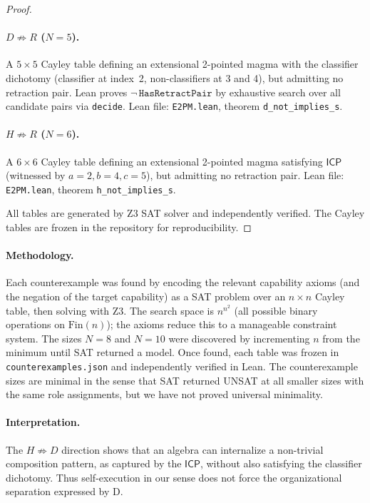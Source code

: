 \documentclass[a4paper,UKenglish,cleveref,autoref,thm-restate]{lipics-v2021}
\newcommand{\ICP}{\textsf{ICP}}
\newcommand{\Fin}{\mathrm{Fin}}
\begin{document}
\begin{proof}
\paragraph{$D \not\Rightarrow R$ ($N\!=\!5$).}
A $5 \times 5$ Cayley table defining an extensional 2-pointed magma with the classifier dichotomy (classifier at index~2, non-classifiers at 3 and 4), but admitting no retraction pair. Lean proves $\neg\,\texttt{HasRetractPair}$ by exhaustive search over all candidate pairs via \texttt{decide}. Lean file: \texttt{E2PM.lean}, theorem \texttt{d\_not\_implies\_s}.

\paragraph{$H \not\Rightarrow R$ ($N\!=\!6$).}
A $6 \times 6$ Cayley table defining an extensional 2-pointed magma satisfying $\ICP$ (witnessed by $a\!=\!2, b\!=\!4, c\!=\!5$), but admitting no retraction pair. Lean file: \texttt{E2PM.lean}, theorem \texttt{h\_not\_implies\_s}.

All tables are generated by Z3 SAT solver and independently verified. The Cayley tables are frozen in the repository for reproducibility.
\end{proof}

\paragraph{Methodology.}
Each counterexample was found by encoding the relevant capability axioms (and the negation of the target capability) as a SAT problem over an $n \times n$ Cayley table, then solving with Z3. The search space is $n^{n^2}$ (all possible binary operations on $\Fin(n)$); the axioms reduce this to a manageable constraint system. The sizes $N\!=\!8$ and $N\!=\!10$ were discovered by incrementing $n$ from the minimum until SAT returned a model. Once found, each table was frozen in \texttt{counterexamples.json} and independently verified in Lean. The counterexample sizes are minimal in the sense that SAT returned UNSAT at all smaller sizes with the same role assignments, but we have not proved universal minimality.

\paragraph{Interpretation.}
The $H \not\Rightarrow D$ direction shows that an algebra can internalize a non-trivial composition pattern, as captured by the $\ICP$, without also satisfying the classifier dichotomy. Thus self-execution in our sense does not force the organizational separation expressed by D.
\end{document}
